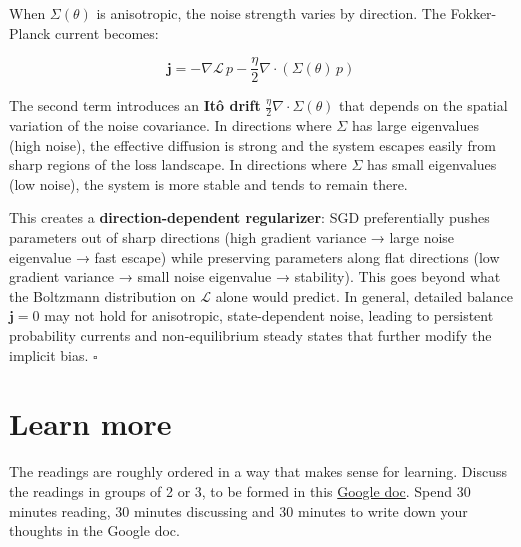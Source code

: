 \documentclass[11pt]{article}
\begin{document}
\begin{solution}[ex:td-6c]
When \(\Sigma(\theta)\) is anisotropic, the noise strength
varies by direction. The Fokker-Planck current becomes:

\[\mathbf{j} = -\nabla\mathcal{L}\,p - \frac{\eta}{2}\nabla\cdot(\Sigma(\theta)\,p)\]

The second term introduces an \textbf{Itô drift}
\(\frac{\eta}{2}\nabla\cdot\Sigma(\theta)\) that depends on the spatial
variation of the noise covariance. In directions where \(\Sigma\) has
large eigenvalues (high noise), the effective diffusion is strong and
the system escapes easily from sharp regions of the loss landscape. In
directions where \(\Sigma\) has small eigenvalues (low noise), the
system is more stable and tends to remain there.

This creates a \textbf{direction-dependent regularizer}: SGD
preferentially pushes parameters out of sharp directions (high gradient
variance → large noise eigenvalue → fast escape) while preserving
parameters along flat directions (low gradient variance → small noise
eigenvalue → stability). This goes beyond what the Boltzmann
distribution on \(\mathcal{L}\) alone would predict. In general,
detailed balance \(\mathbf{j} = 0\) may not hold for anisotropic,
state-dependent noise, leading to persistent probability currents and
non-equilibrium steady states that further modify the implicit bias.
\(\square\)
\end{solution}

\section*{Learn more}

The readings are roughly ordered in a way that makes sense for learning. Discuss the readings in groups of 2 or 3, to be formed in this \href{https://docs.google.com/document/d/13u-zhLUnAT9Wzn2IUsbNUOt9vNE5u8QV8GV1NAr1gow/edit?tab=t.0}{Google doc}. Spend 30 minutes reading, 30 minutes discussing and 30 minutes to write down your thoughts in the Google doc.
\end{document}
